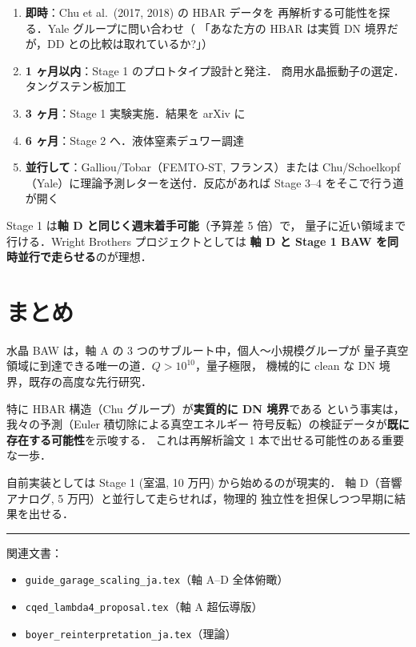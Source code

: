 \documentclass[11pt,a4paper]{article}
\begin{document}
\begin{enumerate}
\item \textbf{即時}：Chu et al.\ (2017, 2018) の HBAR データを
再解析する可能性を探る．Yale グループに問い合わせ（
「あなた方の HBAR は実質 DN 境界だが，DD との比較は取れているか?」）
\item \textbf{1 ヶ月以内}：Stage 1 のプロトタイプ設計と発注．
商用水晶振動子の選定．タングステン板加工
\item \textbf{3 ヶ月}：Stage 1 実験実施．結果を arXiv に
\item \textbf{6 ヶ月}：Stage 2 へ．液体窒素デュワー調達
\item \textbf{並行して}：Galliou/Tobar（FEMTO-ST, フランス）または
Chu/Schoelkopf（Yale）に理論予測レターを送付．反応があれば
Stage 3--4 をそこで行う道が開く
\end{enumerate}

Stage 1 は\textbf{軸 D と同じく週末着手可能}（予算差 5 倍）で，
量子に近い領域まで行ける．Wright Brothers プロジェクトとしては
\textbf{軸 D と Stage 1 BAW を同時並行で走らせる}のが理想．

\section{まとめ}

水晶 BAW は，軸 A の 3 つのサブルート中，個人〜小規模グループが
量子真空領域に到達できる唯一の道．$Q>10^{10}$，量子極限，
機械的に clean な DN 境界，既存の高度な先行研究．

特に HBAR 構造（Chu グループ）が\textbf{実質的に DN 境界}である
という事実は，我々の予測（Euler 積切除による真空エネルギー
符号反転）の検証データが\textbf{既に存在する可能性}を示唆する．
これは再解析論文 1 本で出せる可能性のある重要な一歩．

自前実装としては Stage 1 (室温, 10 万円) から始めるのが現実的．
軸 D（音響アナログ, 5 万円）と並行して走らせれば，物理的
独立性を担保しつつ早期に結果を出せる．

\vspace{1em}
\hrule
\vspace{0.5em}
\small
\noindent
関連文書：
\begin{itemize}
\item \texttt{guide\_garage\_scaling\_ja.tex}（軸 A--D 全体俯瞰）
\item \texttt{cqed\_lambda4\_proposal.tex}（軸 A 超伝導版）
\item \texttt{boyer\_reinterpretation\_ja.tex}（理論）
\end{itemize}
\end{document}
